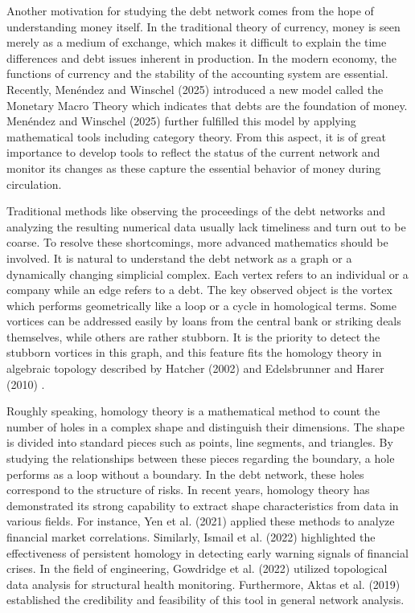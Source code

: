 \documentclass[12pt,reqno]{amsart}
\theoremstyle{definition}
\numberwithin{equation}{section}
\begin{document}
    Another motivation for studying the debt network comes from the hope of understanding money itself. In the traditional theory of currency, money is seen merely as a medium of exchange, which makes it difficult to explain the time differences and debt issues inherent in production. In the modern economy, the functions of currency and the stability of the accounting system are essential. Recently, Men\'{e}ndez and Winschel (2025) \cite{MW25a} introduced a new model called the Monetary Macro Theory which indicates that debts are the foundation of money. Men\'{e}ndez and Winschel (2025) \cite{MW25b} further fulfilled this model by applying mathematical tools including category theory. From this aspect, it is of great importance to develop tools to reflect the status of the current network and monitor its changes as these capture the essential behavior of money during circulation.
    
    Traditional methods like observing the proceedings of the debt networks and analyzing the resulting numerical data usually lack timeliness and turn out to be coarse. To resolve these shortcomings, more advanced mathematics should be involved. It is natural to understand the debt network as a graph or a dynamically changing simplicial complex. Each vertex refers to an individual or a company while an edge refers to a debt. The key observed object is the vortex which performs geometrically like a loop or a cycle in homological terms. Some vortices can be addressed easily by loans from the central bank or striking deals themselves, while others are rather stubborn. It is the priority to detect the stubborn vortices in this graph, and this feature fits the homology theory in algebraic topology described by Hatcher (2002) \cite{Hat02} and Edelsbrunner and Harer (2010) \cite{EH10}. 

    Roughly speaking, homology theory is a mathematical method to count the number of holes in a complex shape and distinguish their dimensions. The shape is divided into standard pieces such as points, line segments, and triangles. By studying the relationships between these pieces regarding the boundary, a hole performs as a loop without a boundary. In the debt network, these holes correspond to the structure of risks. In recent years, homology theory has demonstrated its strong capability to extract shape characteristics from data in various fields. For instance, Yen et al. (2021) \cite{YXC21} applied these methods to analyze financial market correlations. Similarly, Ismail et al. (2022) \cite{INIRA22} highlighted the effectiveness of persistent homology in detecting early warning signals of financial crises. In the field of engineering, Gowdridge et al. (2022) \cite{GDW22} utilized topological data analysis for structural health monitoring. Furthermore, Aktas et al. (2019) \cite{AAF19} established the credibility and feasibility of this tool in general network analysis.
    
\end{document}
